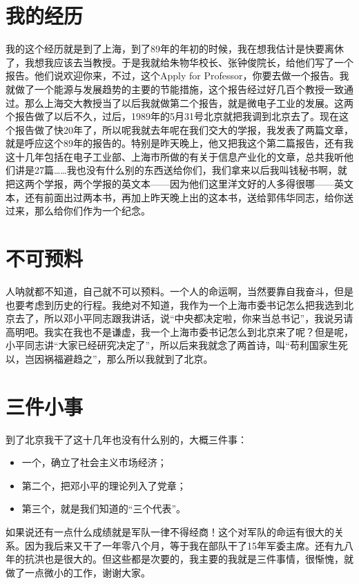 \section{我的经历}
我的这个经历就是到了上海，到了89年的年初的时候，我在想我估计是快要离休了，我想我应该去当教授。于是我就给朱物华校长、张钟俊院长，给他们写了一个报告。他们说欢迎你来，不过，这个Apply for Professor，你要去做一个报告。我就做了一个能源与发展趋势的主要的节能措施，这个报告经过好几百个教授一致通过。那么上海交大教授当了以后我就做第二个报告，就是微电子工业的发展。这两个报告做了以后不久，过后，1989年的5月31号北京就把我调到北京去了。现在这个报告做了快20年了，所以呢我就去年呢在我们交大的学报，我发表了两篇文章，就是呼应这个89年的报告的。特别是昨天晚上，他又把我这个第二篇报告，还有我这十几年包括在电子工业部、上海市所做的有关于信息产业化的文章，总共我听他们讲是27篇……我也没有什么别的东西送给你们，我们拿来以后我叫钱秘书啊，就把这两个学报，两个学报的英文本——因为他们这里洋文好的人多得很哪——英文本，还有前面出过两本书，再加上昨天晚上出的这本书，送给郭伟华同志，给你送过来，那么给你们作为一个纪念。

\section{不可预料}
人呐就都不知道，自己就不可以预料。一个人的命运啊，当然要靠自我奋斗，但是也要考虑到历史的行程。我绝对不知道，我作为一个上海市委书记怎么把我选到北京去了，所以邓小平同志跟我讲话，说“中央都决定啦，你来当总书记”，我说另请高明吧。我实在我也不是谦虚，我一个上海市委书记怎么到北京来了呢？但是呢，小平同志讲“大家已经研究决定了”，所以后来我就念了两首诗，叫“苟利国家生死以，岂因祸福避趋之”，那么所以我就到了北京。

\section{三件小事}
到了北京我干了这十几年也没有什么别的，大概三件事：

\begin{itemize}
	\item 一个，确立了社会主义市场经济；
	\item 第二个，把邓小平的理论列入了党章；
	\item 第三个，就是我们知道的“三个代表”。
\end{itemize}

如果说还有一点什么成绩就是军队一律不得经商！这个对军队的命运有很大的关系。因为我后来又干了一年零八个月，等于我在部队干了15年军委主席。还有九八年的抗洪也是很大的。但这些都是次要的，我主要的我就是三件事情，很惭愧，就做了一点微小的工作，谢谢大家。



